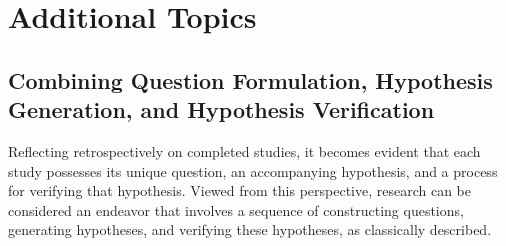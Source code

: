 



\section{Additional Topics}

\subsection{Combining Question Formulation, Hypothesis Generation, and Hypothesis Verification}
Reflecting retrospectively on completed studies, it becomes evident that each study possesses its unique question, an accompanying hypothesis, and a process for verifying that hypothesis. Viewed from this perspective, research can be considered an endeavor that involves a sequence of constructing questions, generating hypotheses, and verifying these hypotheses, as classically described.

